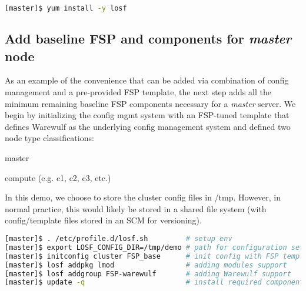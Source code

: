 \documentclass[letterpaper]{article}
\begin{document}

\begin{lstlisting}[language=bash,caption={Commands run on {\bf master node}.}]
[master]$ yum install -y losf
\end{lstlisting}


\subsection{Add baseline FSP and components for {\em master} node}

As an example of the convenience that can be added via combination of config
management and a pre-provided FSP template, the next step adds all the minimum remaining
baseline FSP components necessary for a {\em master} server. We begin by
initializing the config mgmt system with an FSP-tuned template that defines
Warewulf as the underlying config management system and defined two node type classifications:
\begin{itemize*}
\item master
\item compute (e.g. c1, c2, c3, etc.)
\end{itemize*}
In this demo, we choose to store the cluster config files in /tmp. However, in
normal practice, this would likely be stored in a shared file system (with
config/template files stored in an SCM for versioning).


\begin{lstlisting}[language=bash,keywords={}]
[master]$ . /etc/profile.d/losf.sh         # setup env
[master]$ export LOSF_CONFIG_DIR=/tmp/demo # path for configuration setup
[master]$ initconfig cluster FSP_base      # init config with FSP template
[master]$ losf addpkg lmod                 # adding modules support
[master]$ losf addgroup FSP-warewulf       # adding Warewulf support
[master]$ update -q                        # install required components
\end{lstlisting}

\end{document}
